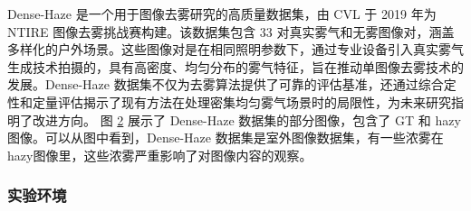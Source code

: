 Dense-Haze 是一个用于图像去雾研究的高质量数据集，由 CVL 于 2019 年为 NTIRE 图像去雾挑战赛构建。该数据集包含 33 对真实雾气和无雾图像对，涵盖多样化的户外场景。这些图像对是在相同照明参数下，通过专业设备引入真实雾气生成技术拍摄的，具有高密度、均匀分布的雾气特征，旨在推动单图像去雾技术的发展。Dense-Haze 数据集不仅为去雾算法提供了可靠的评估基准，还通过综合定性和定量评估揭示了现有方法在处理密集均匀雾气场景时的局限性，为未来研究指明了改进方向。
图 \ref{fig:dense_haze} 展示了 Dense-Haze 数据集的部分图像，包含了 GT 和 hazy 图像。可以从图中看到，Dense-Haze 数据集是室外图像数据集，有一些浓雾在hazy图像里，这些浓雾严重影响了对图像内容的观察。

\begin{figure}[htb]
    \centering
    \captionsetup{font=footnotesize}
    \label{fig:nyu2}
\end{figure}

\begin{figure}[htb]
    \centering
    \captionsetup{font=footnotesize}
    \label{fig:dense_haze}
\end{figure}


\subsubsection{实验环境}

